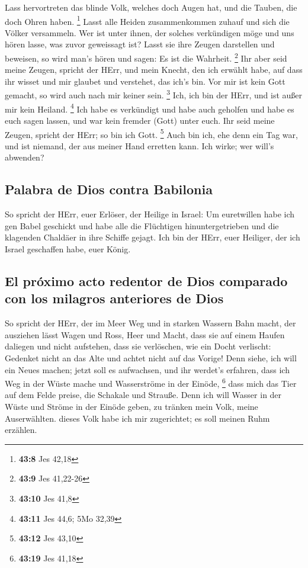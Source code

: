  Lass hervortreten das blinde Volk, welches doch Augen
hat, und die Tauben, die doch Ohren haben. \footnote{\textbf{43:8} Jes
  42,18}  Lasst alle Heiden zusammenkommen zuhauf und sich
die Völker versammeln. Wer ist unter ihnen, der solches verkündigen möge
und uns hören lasse, was zuvor geweissagt ist? Lasst sie ihre Zeugen
darstellen und beweisen, so wird man's hören und sagen: Es ist die
Wahrheit. \footnote{\textbf{43:9} Jes 41,22-26}  Ihr aber
seid meine Zeugen, spricht der HErr, und mein Knecht, den ich erwählt
habe, auf dass ihr wisset und mir glaubet und verstehet, das ich's bin.
Vor mir ist kein Gott gemacht, so wird auch nach mir keiner sein.
\footnote{\textbf{43:10} Jes 41,8}  Ich, ich bin der
HErr, und ist außer mir kein Heiland. \footnote{\textbf{43:11} Jes 44,6;
  5Mo 32,39}  Ich habe es verkündigt und habe auch
geholfen und habe es euch sagen lassen, und war kein fremder (Gott)
unter euch. Ihr seid meine Zeugen, spricht der HErr; so bin ich Gott.
\footnote{\textbf{43:12} Jes 43,10}  Auch bin ich, ehe
denn ein Tag war, und ist niemand, der aus meiner Hand erretten kann.
Ich wirke; wer will's abwenden?

\hypertarget{palabra-de-dios-contra-babilonia}{%
\subsection{Palabra de Dios contra
Babilonia}\label{palabra-de-dios-contra-babilonia}}

 So spricht der HErr, euer Erlöser, der Heilige in
Israel: Um euretwillen habe ich gen Babel geschickt und habe alle die
Flüchtigen hinuntergetrieben und die klagenden Chaldäer in ihre Schiffe
gejagt.  Ich bin der HErr, euer Heiliger, der ich Israel
geschaffen habe, euer König.

\hypertarget{el-pruxf3ximo-acto-redentor-de-dios-comparado-con-los-milagros-anteriores-de-dios}{%
\subsection{El próximo acto redentor de Dios comparado con los milagros
anteriores de
Dios}\label{el-pruxf3ximo-acto-redentor-de-dios-comparado-con-los-milagros-anteriores-de-dios}}

 So spricht der HErr, der im Meer Weg und in starken
Wassern Bahn macht,  der ausziehen lässt Wagen und Ross,
Heer und Macht, dass sie auf einem Haufen daliegen und nicht aufstehen,
dass sie verlöschen, wie ein Docht verlischt:  Gedenket
nicht an das Alte und achtet nicht auf das Vorige!  Denn
siehe, ich will ein Neues machen; jetzt soll es aufwachsen, und ihr
werdet's erfahren, dass ich Weg in der Wüste mache und Wasserströme in
der Einöde, \footnote{\textbf{43:19} Jes 41,18}  dass
mich das Tier auf dem Felde preise, die Schakale und Strauße. Denn ich
will Wasser in der Wüste und Ströme in der Einöde geben, zu tränken mein
Volk, meine Auserwählten.  dieses Volk habe ich mir
zugerichtet; es soll meinen Ruhm erzählen.

